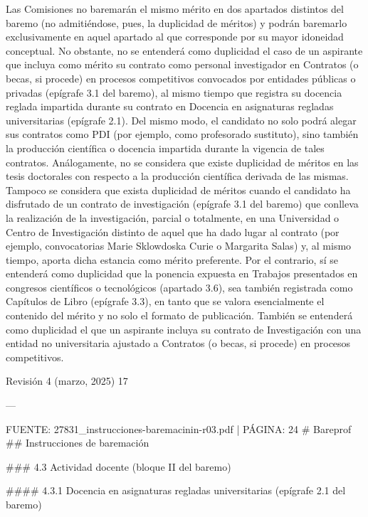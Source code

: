 \documentclass{article}
\begin{document}
\begin{itemize}
\begin{itemize}
\begin{scriptsize}
                  Las Comisiones no baremarán el mismo mérito en dos apartados distintos del baremo (no admitiéndose, pues, la duplicidad de méritos) y podrán baremarlo exclusivamente en aquel apartado al que corresponde por su mayor idoneidad conceptual. No obstante, no se entenderá como duplicidad el caso de un aspirante que incluya como mérito su contrato como personal investigador en Contratos (o becas, si procede) en procesos competitivos convocados por entidades públicas o privadas (epígrafe 3.1 del baremo), al mismo tiempo que registra su docencia reglada impartida durante su contrato en Docencia en asignaturas regladas universitarias (epígrafe 2.1). Del mismo modo, el candidato no solo podrá alegar sus contratos como PDI (por ejemplo, como profesorado sustituto), sino también la producción científica o docencia impartida durante la vigencia de tales contratos. Análogamente, no se considera que existe duplicidad de méritos en las tesis doctorales con respecto a la producción científica derivada de las mismas. Tampoco se considera que exista duplicidad de méritos cuando el candidato ha disfrutado de un contrato de investigación (epígrafe 3.1 del baremo) que conlleva la realización de la investigación, parcial o totalmente, en una Universidad o Centro de Investigación distinto de aquel que ha dado lugar al contrato (por ejemplo, convocatorias Marie Sklowdoska Curie o Margarita Salas) y, al mismo tiempo, aporta dicha estancia como mérito preferente. Por el contrario, sí se entenderá como duplicidad que la ponencia expuesta en Trabajos presentados en congresos científicos o tecnológicos (apartado 3.6), sea también registrada como Capítulos de Libro (epígrafe 3.3), en tanto que se valora esencialmente el contenido del mérito y no solo el formato de publicación. También se entenderá como duplicidad el que un aspirante incluya su contrato de Investigación con una entidad no universitaria ajustado a Contratos (o becas, si procede) en procesos competitivos.

                  Revisión 4 (marzo, 2025) 17

                  ---

                  FUENTE: 27831\_instrucciones-baremacinin-r03.pdf | PÁGINA: 24
                  \# Bareprof
                  \#\# Instrucciones de baremación

                  \#\#\# 4.3 Actividad docente (bloque II del baremo)

                  \#\#\#\# 4.3.1 Docencia en asignaturas regladas universitarias (epígrafe 2.1 del baremo)


\end{scriptsize}
\end{itemize}
\end{itemize}
\end{document}
